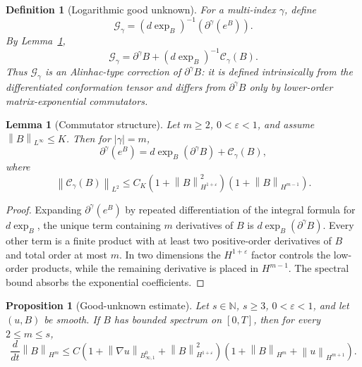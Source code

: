 \documentclass[11pt]{article}
\newtheorem{proposition}{Proposition}[section]
\newtheorem{lemma}{Lemma}[section]
\newtheorem{definition}{Definition}[section]
\newcommand{\calC}{\mathcal C}
\newcommand{\calG}{\mathcal G}
\newcommand{\eps}{\varepsilon}
\newcommand{\norm}[1]{\left\lVert #1\right\rVert}
\newcommand{\Besov}{B^0_{\infty,1}}
\begin{document}
\begin{definition}[Logarithmic good unknown]
For a multi-index \(\gamma\), define
\[
  \calG_\gamma
  =
  (d\exp_B)^{-1}\left(\partial^\gamma(e^B)\right).
  \label{eq:good-unknown}
\]
By Lemma~\ref{lem:commutator-structure},
\[
  \calG_\gamma
  =
  \partial^\gamma B
  +(d\exp_B)^{-1}\calC_\gamma(B).
\]
Thus \(\calG_\gamma\) is an Alinhac-type correction of
\(\partial^\gamma B\): it is defined intrinsically from the differentiated
conformation tensor and differs from \(\partial^\gamma B\) only by lower-order
matrix-exponential commutators.
\end{definition}

\begin{lemma}[Commutator structure]
\label{lem:commutator-structure}
Let \(m\ge2\), \(0<\eps<1\), and assume \(\norm{B}_{L^\infty}\le K\).  Then
for \(|\gamma|=m\),
\[
  \partial^\gamma(e^B)
  =
  d\exp_B(\partial^\gamma B)+\calC_\gamma(B),
  \label{eq:exp-commutator}
\]
where
\[
  \norm{\calC_\gamma(B)}_{L^2}
  \le
  C_K\left(1+\norm{B}_{H^{1+\eps}}^2\right)
  \left(1+\norm{B}_{H^{m-1}}\right).
  \label{eq:commutator-bound}
\]
\end{lemma}

\begin{proof}
Expanding \(\partial^\gamma(e^B)\) by repeated differentiation of the integral
formula for \(d\exp_B\), the unique term containing \(m\) derivatives of \(B\)
is \(d\exp_B(\partial^\gamma B)\).  Every other term is a finite product with
at least two positive-order derivatives of \(B\) and total order at most \(m\).
In two dimensions the \(H^{1+\eps}\) factor controls the low-order products,
while the remaining derivative is placed in \(H^{m-1}\).  The spectral bound
absorbs the exponential coefficients.
\end{proof}

\begin{proposition}[Good-unknown estimate]
\label{prop:good-unknown}
Let \(s\in\mathbb N\), \(s\ge3\), \(0<\varepsilon<1\), and let \((u,B)\) be smooth.  If \(B\)
has bounded spectrum on \([0,T]\), then for every \(2\le m\le s\),
\[
  \frac{d}{dt}\norm{B}_{H^m}
  \le
  C\left(1+\norm{\nabla u}_{\Besov}
  +\norm{B}_{H^{1+\varepsilon}}^2\right)
  \left(1+\norm{B}_{H^m}+\norm{u}_{H^{m+1}}\right).
\label{eq:good-est}
\]
\end{proposition}
\end{document}
